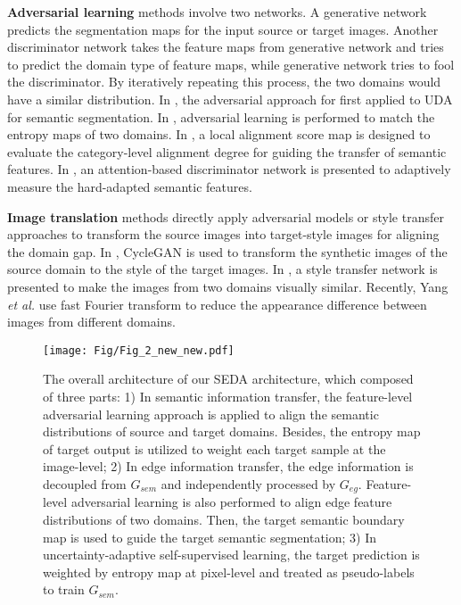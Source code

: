 \documentclass[sigconf]{acmart}
\begin{document}
\par \textbf{Adversarial learning} methods involve two networks. A generative network predicts the segmentation maps for the input source or target images. Another discriminator network takes the feature maps from generative network and tries to predict the domain type of feature maps, while generative network tries to fool the discriminator. By iteratively repeating this process, the two domains would have a similar distribution. In \cite{hoffman2016fcns}, the adversarial approach for first applied to UDA for semantic segmentation. In  \cite{vu2019advent}, adversarial learning is performed to match the entropy maps of two domains. In \cite{luo2019taking}, a local alignment score map is designed to evaluate the category-level alignment degree for guiding the transfer of semantic features. In \cite{yu2021dast}, an attention-based discriminator network is presented to adaptively measure the hard-adapted semantic features. 

\par \textbf{Image translation} methods directly apply adversarial models or style transfer approaches to transform the source images into target-style images for aligning the domain gap. In \cite{hoffman2018cycada}, CycleGAN \cite{zhu2017unpaired} is used to transform the synthetic images of the source domain to the style of the target images. In \cite{zhang2018fully}, a style transfer network is presented to make the images from two domains visually similar. Recently, Yang \emph{et al.} \cite{yang2020fda} use fast Fourier transform to reduce the appearance difference between images from different domains.   

\begin{figure*}[ht]
    \centering
    \texttt{[image: Fig/Fig\_2\_new\_new.pdf]}
    \caption{The overall architecture of our SEDA architecture, which composed of three parts: 1) In semantic information transfer, the feature-level adversarial learning approach is applied to align the semantic distributions of source and target domains. Besides, the entropy map of target output is utilized to weight each target sample at the image-level; 2) In edge information transfer, the edge information is decoupled from $G_{sem}$ and independently processed by $G_{eg}$. Feature-level adversarial learning is also performed to align edge feature distributions of two domains. Then, the target semantic boundary map is used to guide the target semantic segmentation; 3) In uncertainty-adaptive self-supervised learning, the target prediction is weighted by entropy map at pixel-level and treated as pseudo-labels to train $G_{sem}$. }
    \label{fig:2}
\end{figure*}
\end{document}
